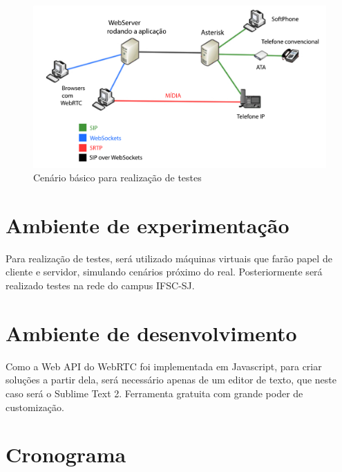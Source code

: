 \documentclass[12pt,a4paper,oneside]{report}
\begin{document}
\begin{figure}[!htdb]
 \centering
  \includegraphics[width = 1\linewidth]{images/cenario}
  \caption{Cenário básico para realização de testes} %
  \label{f_cenario}
\end{figure}

\section{Ambiente de experimentação}
\label{s_ambienteDeExperimentacao} %

Para realização de testes, será utilizado máquinas virtuais que farão papel de cliente e servidor, simulando cenários próximo do real. Posteriormente será realizado testes na rede do campus IFSC-SJ.

\section{Ambiente de desenvolvimento}
\label{s_ambienteDeDesenvolvimento} %

Como a Web API do WebRTC foi implementada em Javascript, para criar soluções a partir dela, será necessário apenas de um editor de texto, que neste caso será o Sublime Text 2. Ferramenta gratuita com grande poder de customização.

\section{Cronograma}
\label{s_cronograma} %
\end{document}
